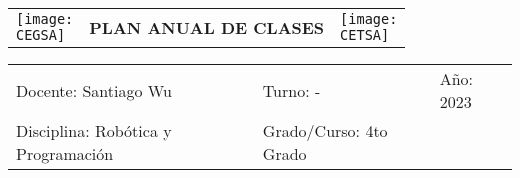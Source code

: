 \documentclass[landscape, a4paper, 10pt]{article}
\newcommand{\profesor}{Santiago Wu}
\newcommand{\discipline}{Robótica y Programación}
\newcommand{\currentyear}{2023}
\newcommand{\CEGSA}{cegsa-logo.png}
\newcommand{\CETSA}{cetsa-logo.png}
\begin{document}
	\pagebreak[4]
	\begin{tabularx}{\textwidth}{ >{\raggedright\arraybackslash}X >{\centering\arraybackslash}X >{\raggedleft\arraybackslash}X }
		\texttt{[image: \\CEGSA]} &
		\textbf{PLAN ANUAL DE CLASES} &
		\texttt{[image: \\CETSA]}
	\end{tabularx}
	\begin{tabularx}{\textwidth}{ >{\raggedright\arraybackslash}X >{\raggedright\arraybackslash}X >{\raggedright\arraybackslash}X }
		Docente: \profesor &
		Turno: - &
		Año: \currentyear \\
		Disciplina: \discipline &
		Grado/Curso: 4to Grado &
		 \\
	\end{tabularx}
	\centering
\end{document}

